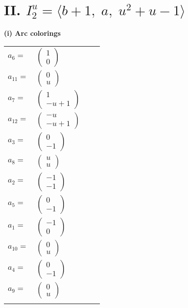 \documentclass[1p]{elsarticle_modified}
\theoremstyle{definition}
\begin{document}
\centering \section*{II. $I^u_{2}= \langle b+1,\;a,\;u^2+u-1 \rangle$}
\flushleft \textbf{(i) Arc colorings}\\
\begin{tabular}{m{7pt} m{180pt} m{7pt} m{180pt} }
\flushright $a_{6}=$&$\begin{pmatrix}1\\0\end{pmatrix}$ \\
\flushright $a_{11}=$&$\begin{pmatrix}0\\u\end{pmatrix}$ \\
\flushright $a_{7}=$&$\begin{pmatrix}1\\- u+1\end{pmatrix}$ \\
\flushright $a_{12}=$&$\begin{pmatrix}- u\\- u+1\end{pmatrix}$ \\
\flushright $a_{3}=$&$\begin{pmatrix}0\\-1\end{pmatrix}$ \\
\flushright $a_{8}=$&$\begin{pmatrix}u\\u\end{pmatrix}$ \\
\flushright $a_{2}=$&$\begin{pmatrix}-1\\-1\end{pmatrix}$ \\
\flushright $a_{5}=$&$\begin{pmatrix}0\\-1\end{pmatrix}$ \\
\flushright $a_{1}=$&$\begin{pmatrix}-1\\0\end{pmatrix}$ \\
\flushright $a_{10}=$&$\begin{pmatrix}0\\u\end{pmatrix}$ \\
\flushright $a_{4}=$&$\begin{pmatrix}0\\-1\end{pmatrix}$ \\
\flushright $a_{9}=$&$\begin{pmatrix}0\\u\end{pmatrix}$\\&\end{tabular}
\end{document}
